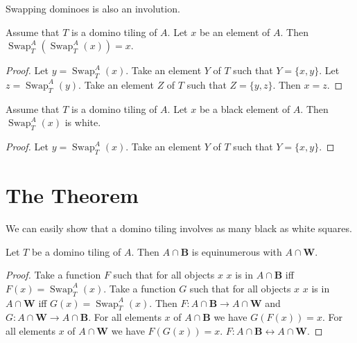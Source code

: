 \documentclass{article}
\newcommand{\Black}{\mathbf{B}}
\newcommand{\White}{\mathbf{W}}
\newcommand{\Sw}[3]{\operatorname{Swap}_{#1}^{#2}(#3)}
\begin{document}
Swapping dominoes is also an involution.

\begin{forthel}
    \begin{lemma}
        Assume that $T$ is a domino tiling of $A$. Let $x$ be an element of $A$.
        Then $\Sw{T}{A}{\Sw{T}{A}{x}} = x$.
    \end{lemma}
    \begin{proof}
        Let $y = \Sw{T}{A}{x}$.
        Take an element $Y$ of $T$ such that $Y = \{x,y\}$.
        Let $z = \Sw{T}{A}{y}$.
        Take an element $Z$ of $T$ such that $Z = \{y,z\}$.
        Then $x = z$.
    \end{proof}

    \begin{lemma}
        Assume that $T$ is a domino tiling of $A$.
        Let $x$ be a black element of $A$.
        Then $\Sw{T}{A}{x}$ is white.
    \end{lemma}
    \begin{proof}
        Let $y = \Sw{T}{A}{x}$.
        Take an element $Y$ of $T$ such that $Y = \{x,y\}$.
    \end{proof}
\end{forthel}

\section{The Theorem}

\noindent We can easily show that a domino tiling involves as many black as white squares.

\begin{forthel}
    \begin{lemma}
        Let $T$ be a domino tiling of $A$. Then $A \cap \Black$ is
        equinumerous with $A \cap \White$.
    \end{lemma}
    \begin{proof}
        Take a function $F$ such that for all objects $x$ $x$ is in $A \cap \Black$ iff $F(x) = \Sw{T}{A}{x}$.
        Take a function $G$ such that for all objects $x$ $x$ is in $A \cap \White$ iff $G(x) = \Sw{T}{A}{x}$.
        Then $F: A \cap \Black \to A \cap \White$ and
        $G: A \cap \White \to A \cap \Black$.
        For all elements $x$ of $A \cap \Black$ we have $G(F(x))=x$.
        For all elements $x$ of $A \cap \White$ we have $F(G(x))=x$.
        $F : A \cap \Black \leftrightarrow A \cap \White$.
    \end{proof}
\end{forthel}
\end{document}

